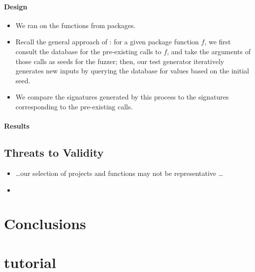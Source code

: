 \documentclass[sigplan,anonymous,review]{acmart}
\begin{document}
\paragraph{Design}
\begin{itemize}
    \item We ran \tool on the   functions from  packages.
    \item Recall the general approach of \tool: for a given package function $f$, we first consult the database for the pre-existing calls to $f$, and take the arguments of those calls as seeds for the fuzzer; then, our test generator iteratively generates new inputs by querying the database for values based on the initial seed.
    \item We compare the signatures generated by this process to the signatures corresponding to the pre-existing calls.
\end{itemize}

\paragraph{Results}

\subsection{Threats to Validity}

\begin{itemize}
    \item \ldots our selection of projects and functions may not be representative \ldots
    \item {}
\end{itemize}

\section{Conclusions}
\label{sec:conclusions}




\appendix

\section{\tool tutorial}
\end{document}
